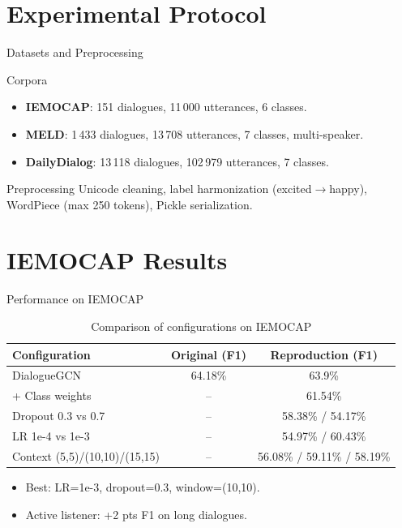 \documentclass[10pt,aspectratio=169]{beamer}
\begin{document}
\section{Experimental Protocol}
\begin{frame}{Datasets and Preprocessing}
  \begin{block}{Corpora}
    \begin{itemize}
      \item \textbf{IEMOCAP}: 151 dialogues, 11\,000 utterances, 6 classes.
      \item \textbf{MELD}: 1\,433 dialogues, 13\,708 utterances, 7 classes, multi-speaker.
      \item \textbf{DailyDialog}: 13\,118 dialogues, 102\,979 utterances, 7 classes.
    \end{itemize}
  \end{block}
  \vspace{0.5em}
  \begin{block}{Preprocessing}
    Unicode cleaning, label harmonization (excited$\to$happy), WordPiece (max 250 tokens), Pickle serialization.
  \end{block}
\end{frame}

\section{IEMOCAP Results}
\begin{frame}{Performance on IEMOCAP}
  \begin{table}
    \centering
    \begin{tabular}{lcc}
      \toprule
      Configuration & Original (F1) & Reproduction (F1) \\
      \midrule
      DialogueGCN & 64.18\% & 63.9\% \\
      + Class weights & -- & 61.54\% \\
      Dropout 0.3 vs 0.7 & -- & 58.38\% / 54.17\% \\
      LR 1e-4 vs 1e-3 & -- & 54.97\% / 60.43\% \\
      Context (5,5)/(10,10)/(15,15) & -- & 56.08\% / 59.11\% / 58.19\% \\
      \bottomrule
    \end{tabular}
    \caption{Comparison of configurations on IEMOCAP}
  \end{table}
  \vfill
  \begin{itemize}
    \item Best: LR=1e-3, dropout=0.3, window=(10,10).
    \item Active listener: +2 pts F1 on long dialogues.
  \end{itemize}
\end{frame}
\end{document}
